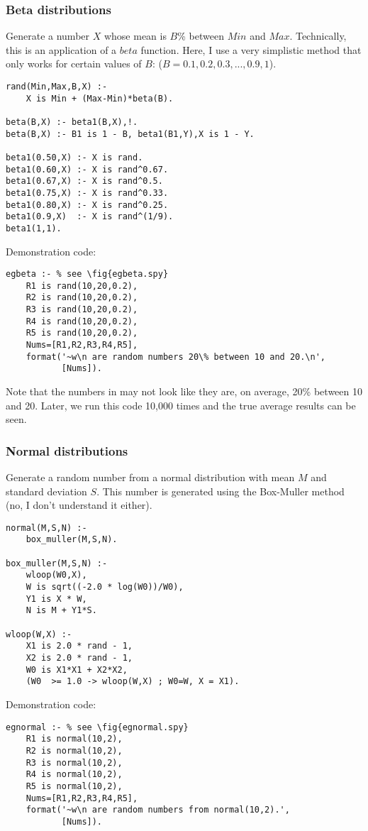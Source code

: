 \subsubsection{ Beta distributions
}
\label{sec:betas}
Generate a number $X$ whose mean is $B$\% 
between $Min$ and
$Max$. Technically, this is an application
of a $beta$ function.
Here, I use a very simplistic method that
only works for certain values of $B$:
($B=0.1,0.2,0.3,...,0.9,1$).
\begin{Verbatim}
rand(Min,Max,B,X) :-
    X is Min + (Max-Min)*beta(B).
    
beta(B,X) :- beta1(B,X),!.
beta(B,X) :- B1 is 1 - B, beta1(B1,Y),X is 1 - Y.

beta1(0.50,X) :- X is rand.
beta1(0.60,X) :- X is rand^0.67.
beta1(0.67,X) :- X is rand^0.5.
beta1(0.75,X) :- X is rand^0.33.
beta1(0.80,X) :- X is rand^0.25.
beta1(0.9,X)  :- X is rand^(1/9).
beta1(1,1).
\end{Verbatim}
Demonstration code:
\begin{Verbatim}
egbeta :- % see \fig{egbeta.spy}
    R1 is rand(10,20,0.2),
    R2 is rand(10,20,0.2),
    R3 is rand(10,20,0.2),
    R4 is rand(10,20,0.2),
    R5 is rand(10,20,0.2),
    Nums=[R1,R2,R3,R4,R5],
    format('~w\n are random numbers 20\% between 10 and 20.\n',
           [Nums]).
\end{Verbatim}
 Note that the numbers in 
may not look like they are, on average, 20\% between 10
and 20. Later, we run this code 10,000 times
and the true average results can be seen.

\subsubsection{ Normal distributions
}
\label{sec:normals}
Generate a random number from a normal distribution
with mean $M$ and standard deviation $S$.
This number is generated using the Box-Muller method
(no, I don't understand it either).
\begin{Verbatim}
normal(M,S,N) :- 
    box_muller(M,S,N).

box_muller(M,S,N) :-
    wloop(W0,X),
    W is sqrt((-2.0 * log(W0))/W0),
    Y1 is X * W,
    N is M + Y1*S.

wloop(W,X) :-
    X1 is 2.0 * rand - 1,
    X2 is 2.0 * rand - 1,
    W0 is X1*X1 + X2*X2,
    (W0  >= 1.0 -> wloop(W,X) ; W0=W, X = X1).
\end{Verbatim}
Demonstration code:
\begin{Verbatim}
egnormal :- % see \fig{egnormal.spy}
    R1 is normal(10,2),
    R2 is normal(10,2),
    R3 is normal(10,2),
    R4 is normal(10,2),
    R5 is normal(10,2),
    Nums=[R1,R2,R3,R4,R5],
    format('~w\n are random numbers from normal(10,2).',
           [Nums]).
\end{Verbatim} 
